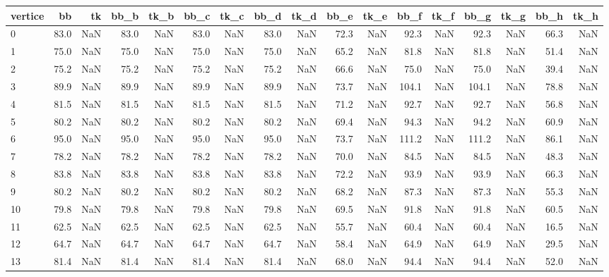 \begin{tabular}{lrrrrrrrrrrrrrrrr}
\toprule
vertice &   bb &  tk &  bb\_b &  tk\_b &  bb\_c &  tk\_c &  bb\_d &  tk\_d &  bb\_e &  tk\_e &  bb\_f &  tk\_f &  bb\_g &  tk\_g &  bb\_h &  tk\_h \\
\midrule
      0 & 83.0 & NaN &  83.0 &   NaN &  83.0 &   NaN &  83.0 &   NaN &  72.3 &   NaN &  92.3 &   NaN &  92.3 &   NaN &  66.3 &   NaN \\
      1 & 75.0 & NaN &  75.0 &   NaN &  75.0 &   NaN &  75.0 &   NaN &  65.2 &   NaN &  81.8 &   NaN &  81.8 &   NaN &  51.4 &   NaN \\
      2 & 75.2 & NaN &  75.2 &   NaN &  75.2 &   NaN &  75.2 &   NaN &  66.6 &   NaN &  75.0 &   NaN &  75.0 &   NaN &  39.4 &   NaN \\
      3 & 89.9 & NaN &  89.9 &   NaN &  89.9 &   NaN &  89.9 &   NaN &  73.7 &   NaN & 104.1 &   NaN & 104.1 &   NaN &  78.8 &   NaN \\
      4 & 81.5 & NaN &  81.5 &   NaN &  81.5 &   NaN &  81.5 &   NaN &  71.2 &   NaN &  92.7 &   NaN &  92.7 &   NaN &  56.8 &   NaN \\
      5 & 80.2 & NaN &  80.2 &   NaN &  80.2 &   NaN &  80.2 &   NaN &  69.4 &   NaN &  94.3 &   NaN &  94.2 &   NaN &  60.9 &   NaN \\
      6 & 95.0 & NaN &  95.0 &   NaN &  95.0 &   NaN &  95.0 &   NaN &  73.7 &   NaN & 111.2 &   NaN & 111.2 &   NaN &  86.1 &   NaN \\
      7 & 78.2 & NaN &  78.2 &   NaN &  78.2 &   NaN &  78.2 &   NaN &  70.0 &   NaN &  84.5 &   NaN &  84.5 &   NaN &  48.3 &   NaN \\
      8 & 83.8 & NaN &  83.8 &   NaN &  83.8 &   NaN &  83.8 &   NaN &  72.2 &   NaN &  93.9 &   NaN &  93.9 &   NaN &  66.3 &   NaN \\
      9 & 80.2 & NaN &  80.2 &   NaN &  80.2 &   NaN &  80.2 &   NaN &  68.2 &   NaN &  87.3 &   NaN &  87.3 &   NaN &  55.3 &   NaN \\
     10 & 79.8 & NaN &  79.8 &   NaN &  79.8 &   NaN &  79.8 &   NaN &  69.5 &   NaN &  91.8 &   NaN &  91.8 &   NaN &  60.5 &   NaN \\
     11 & 62.5 & NaN &  62.5 &   NaN &  62.5 &   NaN &  62.5 &   NaN &  55.7 &   NaN &  60.4 &   NaN &  60.4 &   NaN &  16.5 &   NaN \\
     12 & 64.7 & NaN &  64.7 &   NaN &  64.7 &   NaN &  64.7 &   NaN &  58.4 &   NaN &  64.9 &   NaN &  64.9 &   NaN &  29.5 &   NaN \\
     13 & 81.4 & NaN &  81.4 &   NaN &  81.4 &   NaN &  81.4 &   NaN &  68.0 &   NaN &  94.4 &   NaN &  94.4 &   NaN &  52.0 &   NaN \\

\end{tabular}
